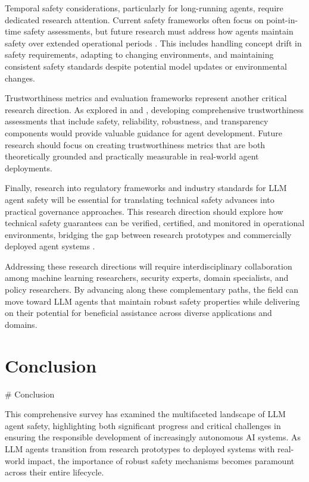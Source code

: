 \documentclass[conference]{IEEEtran}
\begin{document}
Temporal safety considerations, particularly for long-running agents, require dedicated research attention. Current safety frameworks often focus on point-in-time safety assessments, but future research must address how agents maintain safety over extended operational periods \cite{2502.15865}. This includes handling concept drift in safety requirements, adapting to changing environments, and maintaining consistent safety standards despite potential model updates or environmental changes.

Trustworthiness metrics and evaluation frameworks represent another critical research direction. As explored in \cite{2503.04785} and \cite{2401.05561}, developing comprehensive trustworthiness assessments that include safety, reliability, robustness, and transparency components would provide valuable guidance for agent development. Future research should focus on creating trustworthiness metrics that are both theoretically grounded and practically measurable in real-world agent deployments.

Finally, research into regulatory frameworks and industry standards for LLM agent safety will be essential for translating technical safety advances into practical governance approaches. This research direction should explore how technical safety guarantees can be verified, certified, and monitored in operational environments, bridging the gap between research prototypes and commercially deployed agent systems \cite{2412.02113}.

Addressing these research directions will require interdisciplinary collaboration among machine learning researchers, security experts, domain specialists, and policy researchers. By advancing along these complementary paths, the field can move toward LLM agents that maintain robust safety properties while delivering on their potential for beneficial assistance across diverse applications and domains.



\section{Conclusion}

# Conclusion

This comprehensive survey has examined the multifaceted landscape of LLM agent safety, highlighting both significant progress and critical challenges in ensuring the responsible development of increasingly autonomous AI systems. As LLM agents transition from research prototypes to deployed systems with real-world impact, the importance of robust safety mechanisms becomes paramount across their entire lifecycle.
\end{document}
